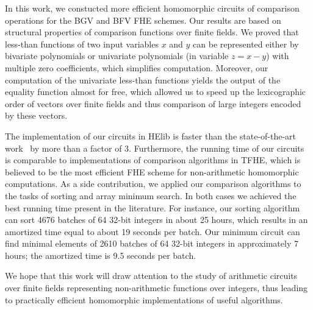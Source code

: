In this work, we constucted more efficient homomorphic circuits of comparison operations for the BGV and BFV FHE schemes.
Our results are based on structural properties of comparison functions over finite fields.
We proved that less-than functions of two input variables $x$ and $y$ can be represented either by bivariate polynomials or univariate polynomials (in variable $z = x - y$) with multiple zero coefficients, which simplifies computation.
Moreover, our computation of the univariate less-than functions yields the output of the equality function almost for free, which allowed us to speed up the lexicographic order of vectors over finite fields and thus comparison of large integers encoded by these vectors.

The implementation of our circuits in HElib is faster than the state-of-the-art work~\cite{TLWRK20} by more than a factor of 3.
Furthermore, the running time of our circuits is comparable to implementations of comparison algorithms in TFHE, which is believed to be the most efficient FHE scheme for non-arithmetic homomorphic computations.
As a side contribution, we applied our comparison algorithms to the tasks of sorting and array minimum search.
In both cases we achieved the best running time present in the literature.
For instance, our sorting algorithm can sort 4676 batches of 64 32-bit integers in about 25 hours, which results in an amortized time equal to about 19 seconds per batch.
Our minimum circuit can find minimal elements of 2610 batches of 64 32-bit integers in approximately 7 hours; the amortized time is 9.5 seconds per batch.

We hope that this work will draw attention to the study of arithmetic circuits over finite fields representing non-arithmetic functions over integers, thus leading to practically efficient homomorphic implementations of useful algorithms.

